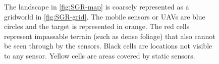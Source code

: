\begin{figure}
{}


\caption{The landscape in \ref{fig:SGR-map} is coarsely represented as a gridworld in \ref{fig:SGR-grid}. The mobile sensors or UAVs are blue circles and the target is represented in orange. The red cells represent impassable terrain (such as dense foliage) that also cannot be seen through by the sensors. Black cells are locations not visible to any sensor. Yellow cells are areas covered by static sensors.}
\label{fig:casestudy}
\end{figure}

